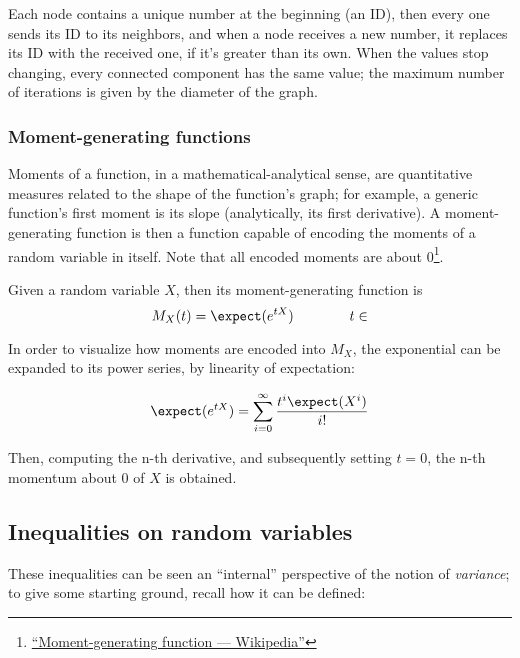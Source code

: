 \begin{ex}
    Each node contains a unique number at the beginning (an ID), then every one sends its ID to its neighbors, and when a node receives a new number, it replaces its ID with the received one, if it's greater than its own. When the values stop changing, every connected component has the same value; the maximum number of iterations is given by the diameter of the graph.
\end{ex}


\subsubsection{Moment-generating functions}
	
Moments of a function, in a mathematical-analytical sense, are quantitative measures related to the shape of the function's graph; for example, a generic function's first moment is its slope (analytically, its first derivative). A moment-generating function is then a function capable of encoding the moments of a random variable in itself. Note that all encoded moments are about 0\footnote{\linkicon \href{https://en.wikipedia.org/wiki/Moment-generating_function}{\textsf{``Moment-generating function --- Wikipedia''}}}.

\begin{defn} Given a random variable $X$, then its moment-generating function is
    \begin{equation}
        M_X(t) = \expect(e^{tX}) \qquad \qquad t \in \real
    \end{equation}
\end{defn}

In order to visualize how moments are encoded into $M_X$, the exponential can be expanded to its power series, by linearity of expectation:

\[
    \expect(e^{tX}) = \sum_{i = 0}^{\infty} \frac{t^i \expect(X^i)}{i!}
\]

Then, computing the n-th derivative, and subsequently setting $t = 0$, the n-th momentum about $0$ of $X$ is obtained.

\subsection{Inequalities on random variables}

These inequalities can be seen an ``internal'' perspective of the notion of \emph{variance}; to give some starting ground, recall how it can be defined:

